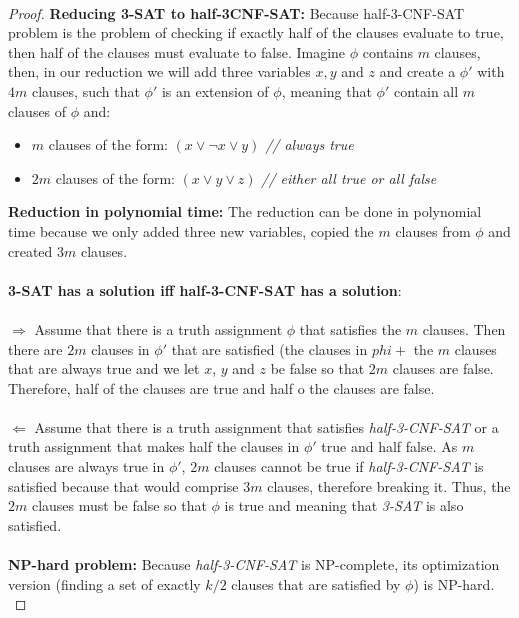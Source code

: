 \documentclass{article}
\begin{document}
\\
\begin{proof}
\textbf{Reducing 3-SAT to half-3CNF-SAT:} Because half-3-CNF-SAT problem is the problem of checking if exactly half of the clauses evaluate to true, then half of the clauses must evaluate to false. Imagine $\phi$ contains $m$ clauses, then, in our reduction we will add three variables $x, y$ and $z$ and create a $\phi'$ with $4m$ clauses, such that $\phi'$ is an extension of $\phi$, meaning that $\phi'$ contain all $m$ clauses of $\phi$ and:
\begin{itemize}
\item $m$ clauses of the form: $(x \lor \lnot x \lor y)$ \textit{ // always true }
\item $2m$ clauses of the form: $(x \lor y \lor z)$ \textit{ // either all true or all false}
\end{itemize}
\textbf{Reduction in polynomial time:} The reduction can be done in polynomial time because we only added three new variables, copied the $m$ clauses from $\phi$ and created $3m$ clauses.
\\
\\
\textbf{3-SAT has a solution iff half-3-CNF-SAT has a solution}:
\\
\\
$\Longrightarrow $ Assume that there is a truth assignment $\phi$ that satisfies the $m$ clauses. Then there are $2m$ clauses in $\phi'$ that are satisfied (the clauses in $phi + $ the $m$ clauses that are always true and we let $x$, $y$ and $z$ be false so that $2m$ clauses are false. Therefore, half of the clauses are true and half o the clauses are false.
\\
\\
$\Longleftarrow $ Assume that there is a truth assignment that satisfies \textit{half-3-CNF-SAT} or a truth assignment that makes half the clauses in $\phi'$ true and half false. As $m$ clauses are always true in $\phi'$, $2m$ clauses cannot be true if \textit{half-3-CNF-SAT} is satisfied because that would comprise $3m$ clauses, therefore breaking it. Thus, the $2m$ clauses must be false so that $\phi$ is true and meaning that \textit{3-SAT} is also satisfied. 
\\
\\
\textbf{NP-hard problem:} Because \textit{half-3-CNF-SAT} is {NP-complete}, its optimization version (finding a set of exactly $k/2$ clauses that are satisfied by $\phi$) is NP-hard.
\\
\end{proof}
\end{document}
